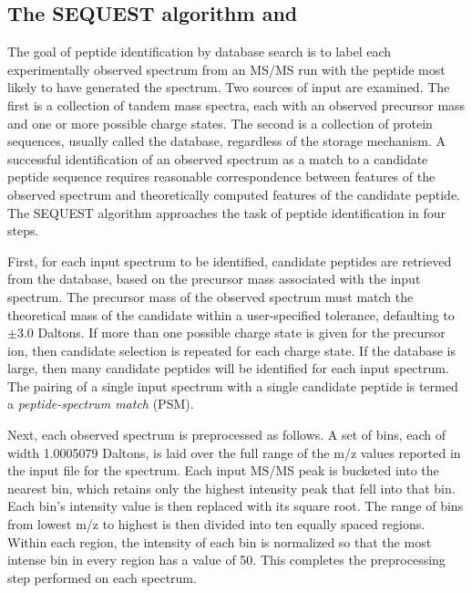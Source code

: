 \subsection{The SEQUEST algorithm and \XCorr}

The goal of peptide identification by database search is to label each
experimentally observed spectrum from an MS/MS run with the peptide
most likely to have generated the spectrum. Two sources of input are
examined. The first is a collection of tandem mass spectra, each
with an observed precursor mass and one or more possible charge
states. The second is a collection of protein sequences, usually
called the database, regardless of the storage mechanism.  A
successful identification of an observed spectrum as a match to a
candidate peptide sequence requires reasonable correspondence between
features of the observed spectrum and theoretically computed features
of the candidate peptide. The SEQUEST algorithm approaches the task of
peptide identification in four steps.

First, for each input spectrum to be identified, candidate peptides
are retrieved from the database, based on the precursor mass
associated with the input spectrum. The precursor mass of the observed
spectrum must match the theoretical mass of the candidate within a
user-specified tolerance, defaulting to $\pm 3.0$ Daltons. If more
than one possible charge state is given for the precursor ion, then
candidate selection is repeated for each charge state. If the database
is large, then many candidate peptides will be identified for each
input spectrum. The pairing of a single input spectrum with a single
candidate peptide is termed a {\it peptide-spectrum match} (PSM).

Next, each observed spectrum is preprocessed as follows. A set of
bins, each of width 1.0005079 Daltons, is laid over the full range of
the m/z values reported in the input file for the spectrum. Each input
MS/MS peak is bucketed into the nearest bin, which retains only the
highest intensity peak that fell into that bin. Each bin's intensity
value is then replaced with its square root. The range of bins from
lowest m/z to highest is then divided into ten equally spaced
regions. Within each region, the intensity of each bin is normalized
so that the most intense bin in every region has a value of 50. This
completes the preprocessing step performed on each spectrum.

